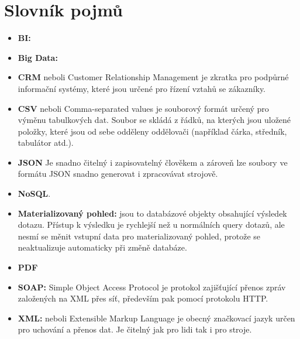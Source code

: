 \documentclass[czech,BP]{thesiskiv}
\begin{document}
\chapter{Slovník pojmů}
\label{Slovník}
\begin{itemize}
	\item[] \textbf{BI:}  \cite{BI}
	\item[] \textbf{Big Data:}  \cite{BigData}
	\item[] \textbf{CRM} neboli Customer Relationship Management je zkratka pro podpůrné informační systémy, které jsou určené pro řízení vztahů se zákazníky.
	\item[] \textbf{CSV} neboli Comma-separated values je souborový formát určený pro výměnu tabulkových dat. Soubor se skládá z řádků, na kterých jsou uložené položky, které jsou od sebe odděleny oddělovači (například čárka, středník, tabulátor atd.).
	\item[] \textbf{JSON}  Je snadno čitelný i zapisovatelný člověkem a zároveň lze soubory ve formátu JSON snadno generovat i zpracovávat strojově.\cite{JSON}
	\item[] \textbf{NoSQL}.\cite{NoSQL}
	\item[] \textbf{Materializovaný pohled:} jsou to databázové objekty obsahující výsledek dotazu. Přístup k výsledku je rychlejší než u normálních query dotazů, ale nesmí se měnit vstupní data pro materializovaný pohled, protože se neaktualizuje automaticky při změně databáze.
	\item[] \textbf{PDF}  \citealp{PDF}
	\item[] \textbf{SOAP:} Simple Object Access Protocol je protokol zajišťující přenos zpráv založených na XML přes síť, především pak pomocí protokolu HTTP.
	\item[] \textbf{XML:} neboli Extensible Markup Language je obecný značkovací jazyk určen pro uchování a přenos dat. Je čitelný jak pro lidi tak i pro stroje.
\end{itemize}







{\raggedright\small

}
\end{document}
